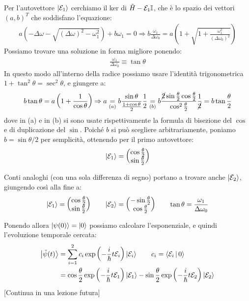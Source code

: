 \documentclass[../../InformazioneQuantistica.tex]{subfiles}
\begin{document}
\begin{enumerate}
Per l'autovettore $\Ket{\mathcal{E}_1}$ cerchiamo il ker di $\tilde{H}-\mathcal{E}_1 \mathbb{I}$, che è lo spazio dei vettori $(a, b)^T$ che soddisfano l'equazione:
\begin{align*}
a(-\Delta \omega - \sqrt{(\Delta \omega)^2 - \omega_1^2} )+b\omega_1 = 0 \Rightarrow b \frac{\omega_1}{\Delta \omega_0} = a\left(1+\sqrt{1+\frac{\omega_1^2}{(\Delta \omega_0)^2}}\right)
\end{align*}
Possiamo trovare una soluzione in forma migliore ponendo:
\begin{align*}
\frac{\omega_1}{\Delta \omega_0} \equiv \tan\theta
\end{align*}
In questo modo all'interno della radice possiamo usare l'identità trigonometrica $1+\tan^2\theta=\sec^2\theta$, e giungere a:
\begin{align*}
b\tan\theta = a \left(1+\frac{1}{\cos\theta}\right) \Rightarrow a \underset{(a)}{=} b\frac{\sin \theta}{\frac{1+\cos\theta}{2}}\frac{1}{2} \underset{(b)}{=} b\frac{\cancel{2}\sin\frac{\theta}{2}\cos\frac{\theta}{2}}{\cos^2 \frac{\theta}{2}}\frac{1}{\cancel{2}} = b \tan\frac{\theta}{2}
\end{align*}
dove in (a) e in (b) si sono usate rispettivamente la formula di bisezione del $\cos$ e di duplicazione del $\sin$. Poiché $b$ si può scegliere arbitrariamente, poniamo $b=\sin \theta/2$ per semplicità, ottenendo per il primo autovettore:
\begin{align*}
\Ket{\mathcal{E}_1} = \begin{pmatrix} \cos\frac{\theta}{2} \\ \sin\frac{\theta}{2}\end{pmatrix}
\end{align*}

Conti analoghi (con una sola differenza di segno) portano a trovare anche $\Ket{\mathcal{E}_2}$, giungendo così alla fine a:
\begin{align*}
\Ket{\mathcal{E}_1} = \begin{pmatrix} \cos\frac{\theta}{2} \\ \sin\frac{\theta}{2}\end{pmatrix} \qquad \Ket{\mathcal{E}_2}=\begin{pmatrix} -\sin\frac{\theta}{2}\\ \cos\frac{\theta}{2}\end{pmatrix} \qquad \tan \theta = \frac{\omega_1}{\Delta \omega_0}
\end{align*}

Ponendo allora $\Ket{\psi(0)}=\Ket{0}$ possiamo calcolare l'esponenziale, e quindi l'evoluzione temporale cercata:
\begin{align*}
\Ket{\tilde{\psi}(t)} &= \sum_{i=1}^2 c_i \exp\left(-\frac{i}{\hbar}t\mathcal{E}_i\right) \Ket{\mathcal{E}_i} \qquad c_i = \Braket{\mathcal{E}_i|0}\\
&= \cos\frac{\theta}{2} \exp\left(-\frac{i}{\hbar}t\mathcal{E}_1\right) \Ket{\mathcal{E}_1} -\sin\frac{\theta}{2} \exp\left(-\frac{i}{\hbar}t\mathcal{E}_2\right) \Ket{\mathcal{E}_2}
\end{align*}
[Continua in una lezione futura]
\end{enumerate}
\end{document}
